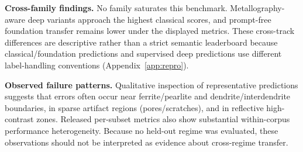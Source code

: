 \documentclass{article}
\begin{document}
\textbf{Cross-family findings.} No family saturates this benchmark.
Metallography-aware deep variants approach the highest classical scores, and
prompt-free foundation transfer remains lower under the displayed metrics.
These cross-track differences are descriptive rather than a strict semantic
leaderboard because classical/foundation predictions and supervised deep
predictions use different label-handling conventions (Appendix~\ref{app:repro}).

\textbf{Observed failure patterns.} Qualitative inspection of representative
predictions suggests that errors often occur near ferrite/pearlite and
dendrite/interdendrite boundaries, in sparse artifact regions
(pores/scratches), and in reflective high-contrast zones. Released per-subset
metrics also show substantial within-corpus performance heterogeneity. Because
no held-out regime was evaluated, these observations should not be interpreted
as evidence about cross-regime transfer.
\end{document}
